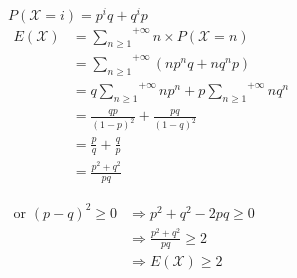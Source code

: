 \documentclass[a4paper, 12pt]{article}
\begin{document}
\begin{flushleft}
$P (\mathcal{X} = i) = p^iq + q^ip$ \\
$
\begin{aligned}
E(\mathcal{X}) &= \overset{+\infty}{\underset{n \geq 1}{\sum}} n \times P (\mathcal{X} = n) \\
&= \overset{+\infty}{\underset{n \geq 1}{\sum}} (np^nq + nq^np) \\
&= q \overset{+\infty}{\underset{n \geq 1}{\sum}} np^n + p \overset{+\infty}{\underset{n \geq 1}{\sum}} nq^n \\
&= \frac{qp}{(1 - p)^2} + \frac{pq}{(1 - q)^2} \\
&= \frac{p}{q} + \frac{q}{p} \\
&\boxed{= \frac{p^2 + q^2}{pq}}
\end{aligned}
$

$
\begin{aligned}
\text{or }(p - q)^2 \geq 0 &\Rightarrow p^2 + q^2 - 2pq \geq 0 \\
&\Rightarrow \frac{p^2 + q^2}{pq} \geq 2 \\
&\Rightarrow E(\mathcal{X}) \geq 2
\end{aligned}
$
\end{flushleft}
\end{document}
